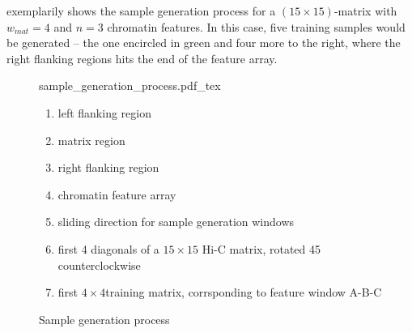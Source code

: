  exemplarily shows the sample generation process for a $(15\times15)$-matrix with $w_{mat}=4$ and $n=3$ chromatin features.
In this case, five training samples would be generated -- the one encircled in green and four more to the right, where the right flanking regions hits the end of the
feature array. 
\begin{figure}
 \begin{minipage}{0.60\textwidth}
   \centering
    \small
    {sample_generation_process.pdf_tex}
    \caption{Sample generation process}
    \label{fig:methods:sample_gen}
 \end{minipage}\hfill
 \begin{minipage}{0.3\textwidth}
 \scriptsize
  \begin{enumerate}[label=\Alph*:,leftmargin=*]
   \raggedright
    \item left flanking region
    \item matrix region
    \item right flanking region
    \item chromatin feature array
    \item sliding direction for sample generation windows
    \item first 4 diagonals of a $15\times15$ Hi-C matrix, rotated \SI{45}{\deg} counterclockwise
    \item first $4\times4$training matrix, corrsponding to feature window A-B-C
\end{enumerate}
 \end{minipage}
\end{figure}

